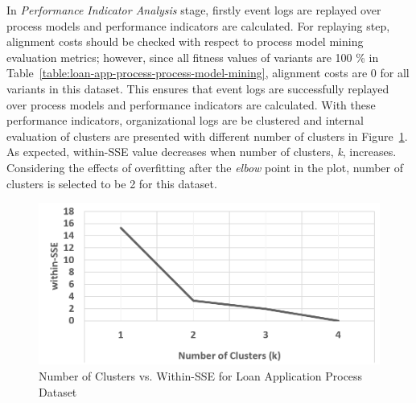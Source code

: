 In \textit{Performance Indicator Analysis} stage, firstly event logs are replayed over process models and performance indicators are calculated. For replaying step, alignment costs should be checked with respect to process model mining evaluation metrics; however, since all fitness values of variants are 100 \% in Table~\ref{table:loan-app-process-process-model-mining}, alignment costs are 0 for all variants in this dataset. This ensures that event logs are successfully replayed over process models and performance indicators are calculated. With these performance indicators, organizational logs are be clustered and internal evaluation of clusters are presented with different number of clusters in Figure~\ref{fig:loan-cluster-sse-plot}. As expected, within-SSE value decreases when number of clusters, \textit{k}, increases. Considering the effects of overfitting after the \textit{elbow} point in the plot, number of clusters is selected to be 2 for this dataset.
\begin{figure}
	\centering
	\includegraphics[width=.7\textwidth]{5_results_discussions/loan-application-process/cluster-sse-plot}
	\caption{Number of Clusters vs. Within-SSE for Loan Application Process Dataset}
  \label{fig:loan-cluster-sse-plot}
\end{figure}

